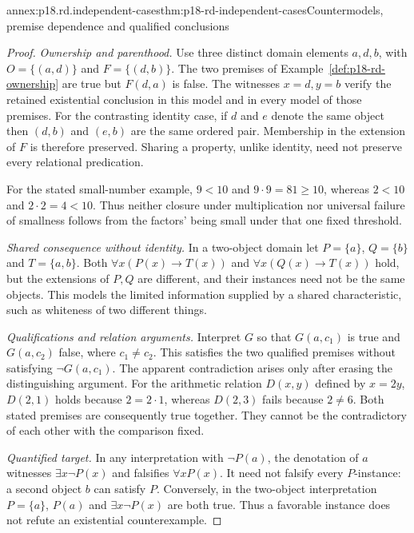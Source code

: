 \begin{annexitem}{annex:p18.rd.independent-cases}{thm:p18-rd-independent-cases}{Countermodels, premise dependence and qualified conclusions}
\begin{proof}
\emph{Ownership and parenthood.} Use three distinct domain elements
\(a,d,b\), with \(O=\{(a,d)\}\) and
\(F=\{(d,b)\}\). The two premises of
Example~\ref{def:p18-rd-ownership} are true but \(F(d,a)\)
is false. The witnesses \(x=d,y=b\) verify the retained
existential conclusion in this model and in every model of those
premises. For the contrasting identity case, if \(d\) and \(e\)
denote the same object then \((d,b)\) and \((e,b)\) are the
same ordered pair. Membership in the extension of \(F\) is
therefore preserved. Sharing a property, unlike identity, need not
preserve every relational predication.

For the stated small-number example, \(9<10\) and
\(9\cdot9=81\geq10\), whereas \(2<10\) and
\(2\cdot2=4<10\). Thus neither closure under multiplication
nor universal failure of smallness follows from the factors' being
small under that one fixed threshold.

\emph{Shared consequence without identity.} In a two-object domain
let \(P=\{a\}\), \(Q=\{b\}\) and \(T=\{a,b\}\).
Both \(\forall x(P(x)\to T(x))\) and
\(\forall x(Q(x)\to T(x))\) hold, but the extensions of
\(P,Q\) are different, and their instances need not be the same
objects. This models the limited information supplied by a shared
characteristic, such as whiteness of two different things.

\emph{Qualifications and relation arguments.} Interpret \(G\)
so that \(G(a,c_1)\) is true and \(G(a,c_2)\) false, where
\(c_1\ne c_2\). This satisfies the two qualified premises
without satisfying \(\neg G(a,c_1)\). The apparent contradiction
arises only after erasing the distinguishing argument. For the
arithmetic relation \(D(x,y)\) defined by \(x=2y\),
\(D(2,1)\) holds because \(2=2\cdot1\), whereas
\(D(2,3)\) fails because \(2\ne6\). Both stated premises
are consequently true together. They cannot be the contradictory
of each other with the comparison fixed.

\emph{Quantified target.} In any interpretation with \(\neg P(a)\),
the denotation of \(a\) witnesses \(\exists x\neg P(x)\)
and falsifies \(\forall xP(x)\). It need not falsify every
\(P\)-instance: a second object \(b\) can satisfy \(P\).
Conversely, in the two-object interpretation \(P=\{a\}\),
\(P(a)\) and \(\exists x\neg P(x)\) are both true.
Thus a favorable instance does not refute an existential counterexample.


\end{proof}
\end{annexitem}
